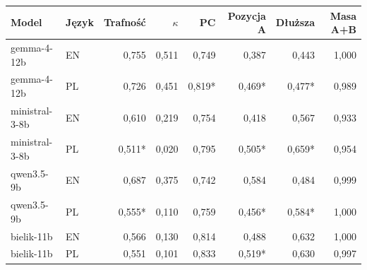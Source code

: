 \begin{tabular}{llrrrrrr}
\toprule
Model & Język & Trafność & $\kappa$ & PC & Pozycja A & Dłuższa & Masa A+B \\
\midrule
gemma-4-12b & EN & 0,755 & 0,511 & 0,749 & 0,387 & 0,443 & 1,000 \\
gemma-4-12b & PL & 0,726 & 0,451 & 0,819* & 0,469* & 0,477* & 0,989 \\
\midrule
ministral-3-8b & EN & 0,610 & 0,219 & 0,754 & 0,418 & 0,567 & 0,933 \\
ministral-3-8b & PL & 0,511* & 0,020 & 0,795 & 0,505* & 0,659* & 0,954 \\
\midrule
qwen3.5-9b & EN & 0,687 & 0,375 & 0,742 & 0,584 & 0,484 & 0,999 \\
qwen3.5-9b & PL & 0,555* & 0,110 & 0,759 & 0,456* & 0,584* & 1,000 \\
\midrule
bielik-11b & EN & 0,566 & 0,130 & 0,814 & 0,488 & 0,632 & 1,000 \\
bielik-11b & PL & 0,551 & 0,101 & 0,833 & 0,519* & 0,630 & 0,997 \\
\bottomrule
\end{tabular}
